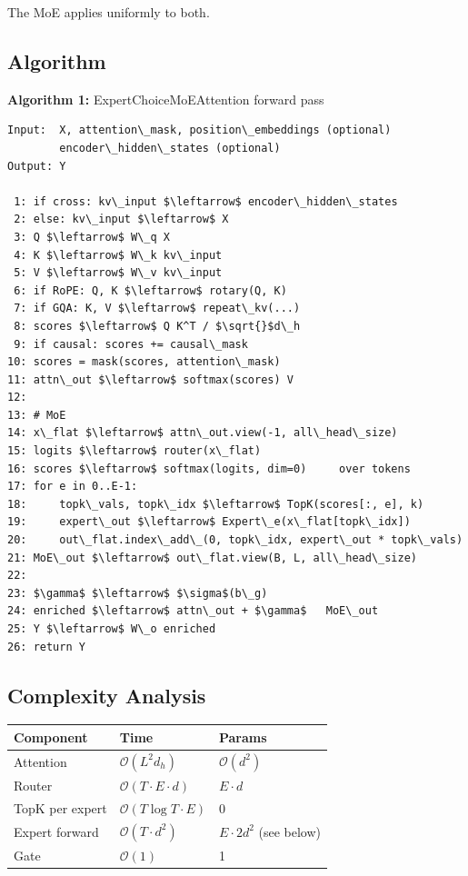 The MoE applies uniformly to both.

\subsection{Algorithm}

\textbf{Algorithm 1:} ExpertChoiceMoEAttention forward pass
\begin{lstlisting}
Input:  X, attention\_mask, position\_embeddings (optional)
        encoder\_hidden\_states (optional)
Output: Y

 1: if cross: kv\_input $\leftarrow$ encoder\_hidden\_states
 2: else: kv\_input $\leftarrow$ X
 3: Q $\leftarrow$ W\_q X
 4: K $\leftarrow$ W\_k kv\_input
 5: V $\leftarrow$ W\_v kv\_input
 6: if RoPE: Q, K $\leftarrow$ rotary(Q, K)
 7: if GQA: K, V $\leftarrow$ repeat\_kv(...)
 8: scores $\leftarrow$ Q K^T / $\sqrt{}$d\_h
 9: if causal: scores += causal\_mask
10: scores = mask(scores, attention\_mask)
11: attn\_out $\leftarrow$ softmax(scores) V
12:
13: # MoE
14: x\_flat $\leftarrow$ attn\_out.view(-1, all\_head\_size)
15: logits $\leftarrow$ router(x\_flat)
16: scores $\leftarrow$ softmax(logits, dim=0)     over tokens
17: for e in 0..E-1:
18:     topk\_vals, topk\_idx $\leftarrow$ TopK(scores[:, e], k)
19:     expert\_out $\leftarrow$ Expert\_e(x\_flat[topk\_idx])
20:     out\_flat.index\_add\_(0, topk\_idx, expert\_out * topk\_vals)
21: MoE\_out $\leftarrow$ out\_flat.view(B, L, all\_head\_size)
22:
23: $\gamma$ $\leftarrow$ $\sigma$(b\_g)
24: enriched $\leftarrow$ attn\_out + $\gamma$   MoE\_out
25: Y $\leftarrow$ W\_o enriched
26: return Y
\end{lstlisting}

\subsection{Complexity Analysis}

\begin{table}[H]
\centering
\small
\begin{tabular}{lll}
\toprule
\textbf{Component} & \textbf{Time} & \textbf{Params} \\
\midrule
Attention & $\mathcal{O}(L^2 d_h)$ & $\mathcal{O}(d^2)$ \\
Router & $\mathcal{O}(T \cdot E \cdot d)$ & $E \cdot d$ \\
TopK per expert & $\mathcal{O}(T \log T \cdot E)$ & 0 \\
Expert forward & $\mathcal{O}(T \cdot d^2)$ & $E \cdot 2d^2$ (see below) \\
Gate & $\mathcal{O}(1)$ & 1 \\
\bottomrule
\end{tabular}
\end{table}

